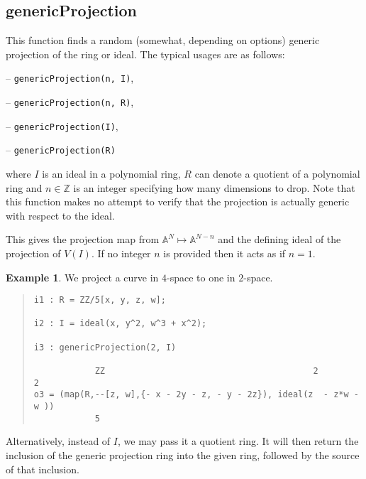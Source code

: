 \documentclass[11pt]{amsart}
\theoremstyle{definition}
\newtheorem{example}{Example}[section]
\begin{document}
\subsection{genericProjection} 
This function finds a random (somewhat, depending on options) generic projection of the ring or ideal.
The typical usages are as follows: 
\vspace{0.5em}

-- {\tt genericProjection(n, I)},

-- {\tt genericProjection(n, R)},


-- {\tt genericProjection(I)},  

-- {\tt genericProjection(R)} 

\vspace{0.5em}
\noindent where 
$I$ is an ideal 
in a polynomial ring, 
$R$ can denote a quotient of a polynomial ring and 
$n\in \mathbb{Z}$ is
an integer specifying how many dimensions to drop.  Note that this function makes no attempt to verify that the projection is actually generic with respect to the ideal.


This gives the projection map from $\mathbb{A}^N \mapsto\mathbb{A}^{N-n}$ and the defining ideal of the projection of $V(I)$. If no integer $n$ is provided then it acts as if $n = 1$. 


\begin{example}	
    We project a curve in $4$-space to one in $2$-space.
    ~~
  {{\small\color{blue}
  \begin{quote}
\begin{verbatim}
i1 : R = ZZ/5[x, y, z, w];

i2 : I = ideal(x, y^2, w^3 + x^2);

i3 : genericProjection(2, I)

            ZZ                                         2          2
o3 = (map(R,--[z, w],{- x - 2y - z, - y - 2z}), ideal(z  - z*w - w ))                   
            5
\end{verbatim}
\end{quote}
    }}
\end{example}\vspace{-1em}
\noindent
Alternatively, instead of {$I$}, we may pass it a quotient ring.  It will then return the inclusion of the generic projection ring into the given ring, followed by the source of that inclusion.  %
\end{document}
